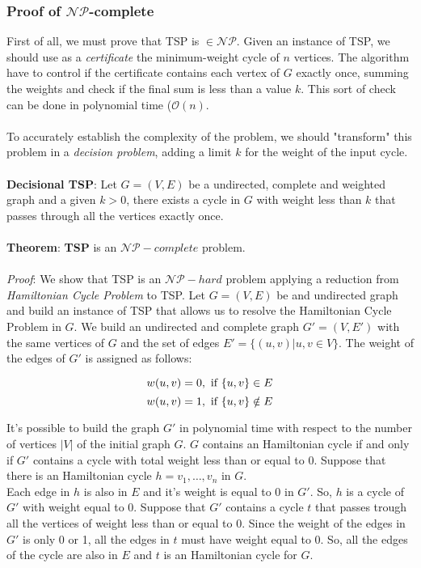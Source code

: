 \subsubsection{Proof of $\mathcal{NP}$-complete}
First of all, we must prove that TSP is $\in \mathcal{NP}$. Given an instance of TSP, we should use as a \textit{certificate} the minimum-weight cycle of $n$ vertices. The algorithm have to control if the certificate contains each vertex of $G$ exactly once, summing the weights and check if the final sum is less than a value $k$. This sort of check can be done in polynomial time ($\mathcal{O}(n)$.\\
\\
\noindent
To accurately establish the complexity of the problem, we should "transform" this problem in a \textit{decision problem}, adding a limit $k$ for the weight of the input cycle.\\
\\
\noindent
\textbf{Decisional TSP}: Let $G = (V,E)$ be a undirected, complete and weighted graph and a given $k > 0$, there exists a cycle in $G$ with weight less than $k$ that passes through all the vertices exactly once.\\
\\
\noindent
\textbf{Theorem}: \textbf{TSP} is an $\mathcal{NP}-complete$ problem.\\
\\
\noindent
\textit{Proof}: We show that TSP is an $\mathcal{NP}-hard$ problem applying a reduction from \textit{Hamiltonian Cycle Problem} to TSP.
Let $G = (V,E)$ be and undirected graph and build an instance of TSP that allows us to resolve the Hamiltonian Cycle Problem in $G$. We build an undirected and complete graph $G' = (V, E')$ with the same vertices of $G$ and the set of edges $E' = \{(u, v) | u,v \in V\}$. The weight of the edges of $G'$ is assigned as follows:

\[
    w(u, v) = 0, \textnormal{ if } \{u, v\} \in E
\]
\[
    w(u, v) = 1, \textnormal{ if } \{u, v\} \notin E
\]

It's possible to build the graph $G'$ in polynomial time with respect to the number of vertices $|V|$ of the initial graph $G$. $G$ contains an Hamiltonian cycle if and only if $G'$ contains a cycle with total weight less than or equal to 0. Suppose that there is an Hamiltonian cycle $h = v_1, \dots, v_n$ in $G$.\\ \noindent
Each edge in $h$ is also in $E$ and it's weight is equal to 0 in $G'$. So, $h$ is a cycle of $G'$ with weight equal to 0. Suppose that $G'$ contains a cycle $t$ that passes trough all the vertices of weight less than or equal to 0. Since the weight of the edges in $G'$ is only 0 or 1, all the edges in $t$ must have weight equal to 0. So, all the edges of the cycle are also in $E$ and $t$ is an Hamiltonian cycle for $G$.

